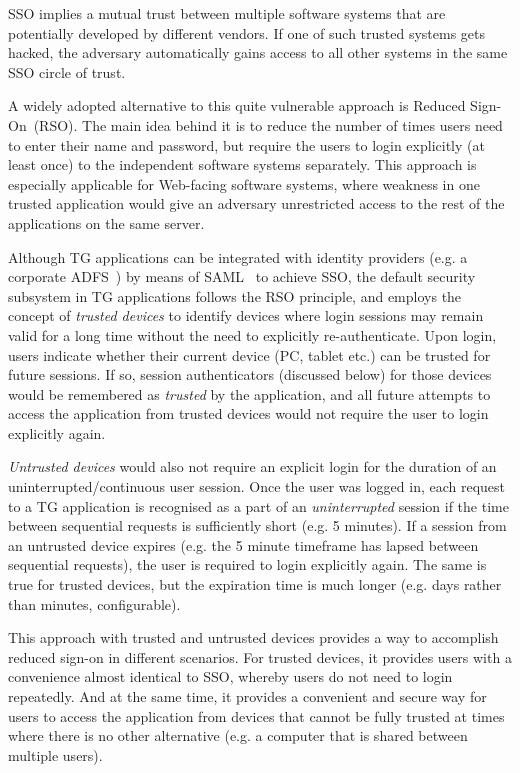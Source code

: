 \documentclass[a4paper,12pt,oneside,openright]{memoir}
\begin{document}
	SSO implies a mutual trust between multiple software systems that are potentially developed by different vendors.
	If one of such trusted systems gets hacked, the adversary automatically gains access to all other systems in the same SSO circle of trust.

	A widely adopted alternative to this quite vulnerable approach is Reduced Sign-On~(RSO).
	The main idea behind it is to reduce the number of times users need to enter their name and password, but require the users to login explicitly (at least once) to the independent software systems separately.
	This approach is especially applicable for Web-facing software systems, where weakness in one trusted application would give an adversary unrestricted access to the rest of the applications on the same server.

	Although TG applications can be integrated with identity providers (e.g. a corporate ADFS~\cite{ADFS}) by means of SAML~\cite{SAML} to achieve SSO, the default security subsystem in TG applications follows the RSO principle, and employs the concept of \emph{trusted devices} to identify devices where login sessions may remain valid for a long time without the need to explicitly re-authenticate.
	Upon login, users indicate whether their current device (PC, tablet etc.) can be trusted for future sessions.
	If so, session authenticators (discussed below) for those devices would be remembered as \emph{trusted} by the application, and all future attempts to access the application from trusted devices would not require the user to login explicitly again.

	\emph{Untrusted devices} would also not require an explicit login for the duration of an uninterrupted/continuous user session.
	Once the user was logged in, each request to a TG application is recognised as a part of an \emph{uninterrupted} session if the time between sequential requests is sufficiently short (e.g. 5 minutes).
	If a session from an untrusted device expires (e.g. the 5 minute timeframe has lapsed between sequential requests), the user is required to login explicitly again.
	The same is true for trusted devices, but the expiration time is much longer (e.g. days rather than minutes, configurable).

	This approach with trusted and untrusted devices provides a way to accomplish reduced sign-on in different scenarios.
	For trusted devices, it provides users with a convenience almost identical to SSO, whereby users do not need to login repeatedly.
	And at the same time, it provides a convenient and secure way for users to access the application from devices that cannot be fully trusted at times where there is no other alternative (e.g. a computer that is shared between multiple users).
\end{document}
